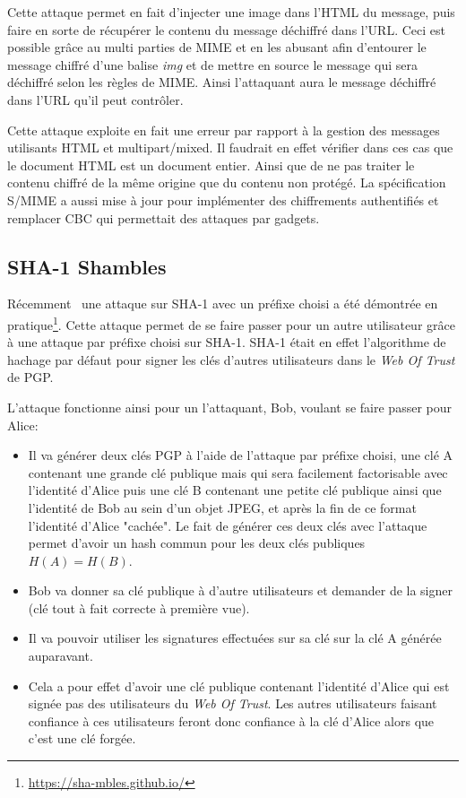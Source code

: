 Cette attaque permet en fait d'injecter une image dans l'HTML du message, puis faire en sorte de récupérer le contenu du message déchiffré dans l'URL. Ceci est possible grâce au multi parties de MIME et en les abusant afin d'entourer le message chiffré d'une balise \textit{img} et de mettre en source le message qui sera déchiffré selon les règles de MIME. Ainsi l'attaquant aura le message déchiffré dans l'URL qu'il peut contrôler. 

Cette attaque exploite en fait une erreur par rapport à la gestion des messages utilisants HTML et multipart/mixed. Il faudrait en effet vérifier dans ces cas que le document HTML est un document entier. Ainsi que de ne pas traiter le contenu chiffré de la même origine que du contenu non protégé. La spécification~\cite{RFC8551} S/MIME a aussi mise à jour pour implémenter des chiffrements authentifiés et remplacer CBC qui permettait des attaques par gadgets.
\subsection{SHA-1 Shambles}
Récemment~\cite{journals/iacr/LeurentP20} une attaque sur SHA-1 avec un préfixe choisi a été démontrée en pratique\footnote{\url{https://sha-mbles.github.io/}}. Cette attaque permet de se faire passer pour un autre utilisateur grâce à une attaque par préfixe choisi sur SHA-1. SHA-1 était en effet l'algorithme de hachage par défaut pour signer les clés d'autres utilisateurs dans le \textit{Web Of Trust} de PGP.

L'attaque fonctionne ainsi pour un l'attaquant, Bob, voulant se faire passer pour Alice: 
\begin{itemize}
	\item Il va générer deux clés PGP à l'aide de l'attaque par préfixe choisi, une clé A contenant une grande clé publique mais qui sera facilement factorisable avec l'identité d'Alice puis une clé B contenant une petite clé publique ainsi que l'identité de Bob au sein d'un objet JPEG, et après la fin de ce format l'identité d'Alice "cachée". Le fait de générer ces deux clés avec l'attaque permet d'avoir un hash commun pour les deux clés publiques $H(A) = H(B)$.
	\item Bob va donner sa clé publique à d'autre utilisateurs et demander de la signer (clé tout à fait correcte à première vue).
	\item Il va pouvoir utiliser les signatures effectuées sur sa clé sur la clé A générée auparavant.
	\item Cela a pour effet d'avoir une clé publique contenant l'identité d'Alice qui est signée pas des utilisateurs du \textit{Web Of Trust}. Les autres utilisateurs faisant confiance à ces utilisateurs feront donc confiance à la clé d'Alice alors que c'est une clé forgée.
\end{itemize}
